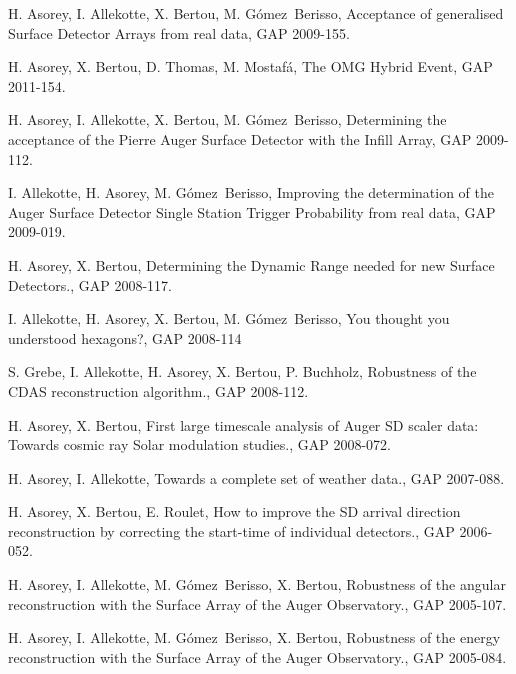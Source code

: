 \begin{etaremune}
\item {}H. Asorey, I. Allekotte, X. Bertou, M. Gómez~Berisso, {{Acceptance of generalised Surface Detector Arrays from real data}}, GAP 2009-155.

\item {}H. Asorey, X. Bertou, D. Thomas, M. Mostafá, {{The OMG Hybrid Event}}, GAP 2011-154.

\item {}H. Asorey, I. Allekotte, X. Bertou, M. Gómez~Berisso, {{Determining the acceptance of the Pierre Auger Surface Detector with the Infill Array}}, GAP 2009-112.

\item {}I. Allekotte, H. Asorey, M. Gómez~Berisso, {{Improving the determination of the Auger Surface Detector Single Station Trigger Probability from real data}}, GAP 2009-019.

\item {}H. Asorey, X. Bertou, {{Determining the Dynamic Range needed for new Surface Detectors.}}, GAP 2008-117.

\item {}I. Allekotte, H. Asorey, X. Bertou, M. Gómez~Berisso, {{You thought you understood hexagons?}}, GAP 2008-114

\item {}S. Grebe, I. Allekotte, H. Asorey, X. Bertou, P. Buchholz, {{Robustness of the CDAS reconstruction algorithm.}}, GAP 2008-112.

\item {}H. Asorey, X. Bertou, {{First large timescale analysis of Auger SD scaler data: Towards cosmic ray Solar modulation studies.}}, GAP 2008-072.

\item {}H. Asorey, I. Allekotte, {{Towards a complete set of weather data.}}, GAP 2007-088.

\item {}H. Asorey, X. Bertou, E. Roulet, {{How to improve the SD arrival direction reconstruction by correcting the start-time of individual detectors.}}, GAP 2006-052.

\item {}H. Asorey, I. Allekotte, M. Gómez~Berisso, X. Bertou, {{Robustness of the angular reconstruction with the Surface Array of the Auger Observatory.}}, GAP 2005-107.

\item {}H. Asorey, I. Allekotte, M. Gómez~Berisso, X. Bertou, {{Robustness of the energy reconstruction with the Surface Array of the Auger Observatory.}}, GAP 2005-084.
\end{etaremune}
